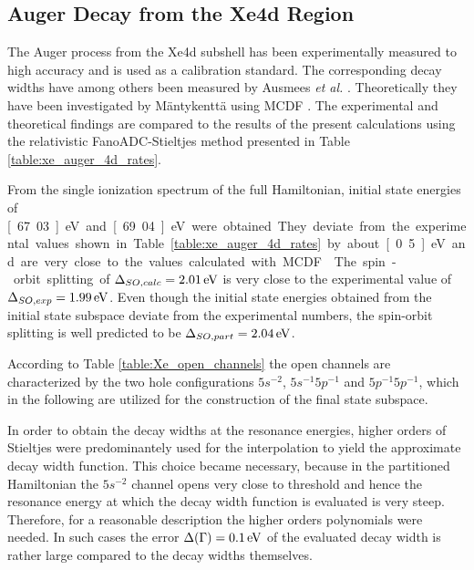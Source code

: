 \subsection{Auger Decay from the Xe4d Region}

The Auger process from the Xe4d subshell has been experimentally
measured to high accuracy \cite{Carroll02} and is used as a calibration standard.
The corresponding decay widths have among others been measured by Ausmees
\textit{et al.} \cite{Ausmees99,Aksela94}.
Theoretically they have been investigated by Mäntykenttä \cite{Maentykenttae93}
using \ac{MCDF} \cite{Fritzsche11}. 
The experimental and theoretical findings are compared to 
the results of the present calculations using the relativistic FanoADC-Stieltjes
method presented in Table \ref{table:xe_auger_4d_rates}.

From the single ionization spectrum of the full Hamiltonian, initial state
energies of \unit[67.03]{eV} and \unit[69.04]{eV} were obtained. They deviate
from the experimental values shown in Table \ref{table:xe_auger_4d_rates}
by about \unit[0.5]{eV} and are very close to the values calculated with
\ac{MCDF} \cite{Fritzsche11}. The spin-orbit splitting of
$\Delta_{SO,calc}=\unit[2.01]{eV}$ is very close to the experimental value
of $\Delta_{SO,exp}=\unit[1.99]{eV}$. Even though the initial state energies 
obtained from the initial state subspace
deviate from the experimental numbers, the spin-orbit
splitting is well predicted to be $\Delta_{SO,part}=\unit[2.04]{eV}$.

According to Table \ref{table:Xe_open_channels} the open channels are characterized
by the two hole configurations $5s^{-2}$, $5s^{-1}5p^{-1}$
and $5p^{-1}5p^{-1}$, which in the following are utilized for the construction
of the final state subspace.

In order to obtain the decay widths at the resonance energies,
higher orders of Stieltjes were predominantely
used for the interpolation to yield the approximate decay width function.
This choice became necessary, because in the partitioned
Hamiltonian the $5s^{-2}$ channel
opens very close to threshold and hence the resonance energy at which the decay width
function is evaluated is very steep. Therefore, for a reasonable description
the higher orders polynomials were needed. In such cases the
error $\Delta(\Gamma)=\unit[0.1]{eV}$ of the evaluated
decay width is rather
large compared to the decay widths themselves.

